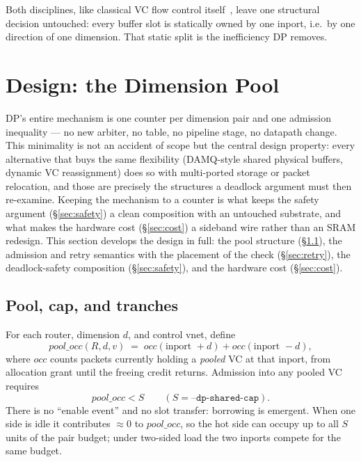 \documentclass[10pt]{article}
\newcommand{\poolocc}{\mathit{pool\_occ}}
\begin{document}
Both disciplines, like classical VC flow control
itself~\cite{dally1992}, leave one structural decision untouched: every
buffer slot is statically owned by one inport, i.e.\ by one direction of
one dimension. That static split is the inefficiency DP removes.

\section{Design: the Dimension Pool}
\label{sec:design}

DP's entire mechanism is one counter per dimension pair and one
admission inequality --- no new arbiter, no table, no pipeline stage, no
datapath change. This minimality is not an accident of scope but the
central design property: every alternative that buys the same
flexibility (DAMQ-style shared physical buffers, dynamic VC
reassignment) does so with multi-ported storage or packet relocation,
and those are precisely the structures a deadlock argument must then
re-examine. Keeping the mechanism to a counter is what keeps the safety
argument (\S\ref{sec:safety}) a clean composition with an untouched
substrate, and what makes the hardware cost (\S\ref{sec:cost}) a
sideband wire rather than an SRAM redesign. This section develops the
design in full: the pool structure (\S\ref{sec:pool}), the admission
and retry semantics with the placement of the check
(\S\ref{sec:retry}), the deadlock-safety composition
(\S\ref{sec:safety}), and the hardware cost (\S\ref{sec:cost}).

\subsection{Pool, cap, and tranches}
\label{sec:pool}

For each router, dimension $d$, and control vnet, define
\begin{equation}
  \poolocc(R, d, v) \;=\; \mathit{occ}(\text{inport } {+}d) +
  \mathit{occ}(\text{inport } {-}d),
\end{equation}
where $\mathit{occ}$ counts packets currently holding a \emph{pooled} VC
at that inport, from allocation grant until the freeing credit returns.
Admission into any pooled VC requires
\begin{equation}
  \poolocc < S \qquad (S = \texttt{--dp-shared-cap}).
\end{equation}
There is no ``enable event'' and no slot transfer: borrowing is emergent.
When one side is idle it contributes $\approx 0$ to $\poolocc$, so the hot
side can occupy up to all $S$ units of the pair budget; under two-sided
load the two inports compete for the same budget.
\end{document}
